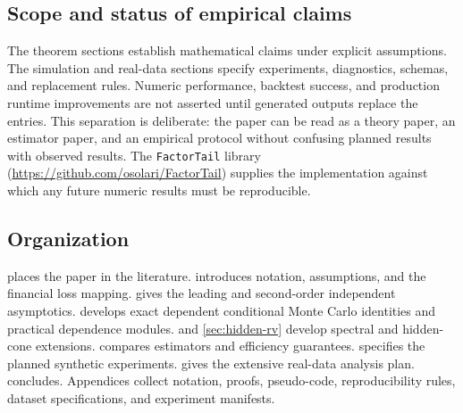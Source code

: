 \subsection{Scope and status of empirical claims}

The theorem sections establish mathematical claims under explicit assumptions.
The simulation and real-data sections specify experiments, diagnostics, schemas,
and replacement rules. Numeric performance, backtest success, and production
runtime improvements are not asserted until generated outputs replace the \xx{}
entries. This separation is deliberate: the paper can be read as a theory paper,
an estimator paper, and an empirical protocol without confusing planned results
with observed results. The \texttt{FactorTail} library
(\url{https://github.com/osolari/FactorTail}) supplies the implementation
against which any future numeric results must be reproducible.

\subsection{Organization}

 places the paper in the literature. 
introduces notation, assumptions, and the financial loss mapping.
 gives the leading and second-order independent
asymptotics.  develops exact dependent conditional
Monte Carlo identities and practical dependence modules. 
and \cref{sec:hidden-rv} develop spectral and hidden-cone extensions.
 compares estimators and efficiency guarantees.
 specifies the planned synthetic experiments.
 gives the extensive real-data analysis plan.
 concludes. Appendices collect notation, proofs,
pseudo-code, reproducibility rules, dataset specifications, and experiment
manifests.
